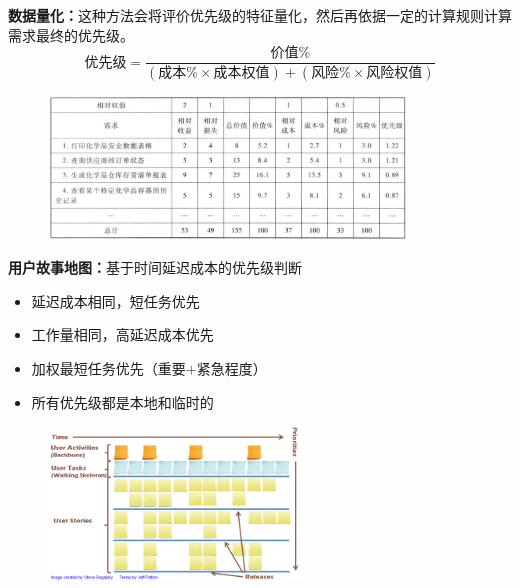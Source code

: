 \textbf{数据量化：}这种方法会将评价优先级的特征量化，然后再依据一定的计算规则计算需求最终的优先级。
\vspace{-0.3em}
$$\mbox{优先级}=\frac{\mbox{价值}\%}{(\mbox{成本\%}\times \mbox{成本权值}) + (\mbox{风险}\% \times \mbox{风险权值})}$$

\begin{figure}[H]
	\centering
    \vspace{-0.8em}
	\includegraphics[width=0.85\textwidth]{img/QFD方法示例.png}
    \vspace{-1em}
\end{figure}

\vspace{-0.5em}
\begin{shaded}
    
\textbf{用户故事地图：}基于时间延迟成本的优先级判断
\begin{itemize}
    \item 延迟成本相同，短任务优先
    \item 工作量相同，高延迟成本优先
    \item 加权最短任务优先（重要$+$紧急程度）
    \item 所有优先级都是本地和临时的
\end{itemize}

\begin{figure}[H]
	\centering
    \vspace{-0.8em}
	\includegraphics[width=0.6\textwidth]{img/用户故事地图.png}
    \vspace{-1em}
\end{figure}

\end{shaded}
\vspace{-1em}

